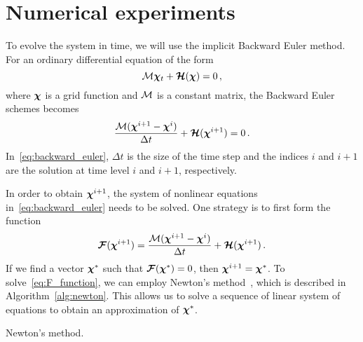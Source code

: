 \section{Numerical experiments}%
\label{sec:numerical_experiments}
To evolve the system in time, we will use the implicit Backward Euler method. For an ordinary differential equation of the form
\begin{equation*}
 \mathcal{M} \bm{\chi}_t + \bm{\mathcal{H}}(\bm{\chi}) = 0
 \, ,
\end{equation*}
where $\bm{\chi}$ is a grid function and $\mathcal{M}$ is a constant matrix, the Backward Euler schemes becomes 
\begin{equation}
  \frac{\Mn (\soln^{i+1} - \soln^i)}{\Delta t} + \Hn(\soln^{i+1}) = 0
  \,.
  \label{eq:backward_euler}
\end{equation}
In~\eqref{eq:backward_euler}, $\Delta t$ is the size of the time step and the indices $i$ and $i+1$ are the solution at time level $i$ and $i+1$, respectively.

In order to obtain $\bm{\chi}^{i+1}$, the system of nonlinear equations in~\eqref{eq:backward_euler} needs to be solved. One strategy is to first form the function 
\begin{equation}
  \Fn(\soln^{i+1}) = 
  \frac{\Mn (\soln^{i+1} - \soln^i)}{\Delta t} + \Hn(\soln^{i+1})
  \,.
  \label{eq:F_function}
\end{equation}
If we find a vector $\bm{\chi}^*$ such that $\bm{\mathcal{F}}(\bm{\chi}^*) = 0$, then $\bm{\chi}^{i+1} = \bm{\chi}^*$. To solve~\eqref{eq:F_function}, we can employ Newton's method~\cite{quarteroni2010numerical}, which is described in Algorithm~\ref{alg:newton}. This allows us to solve a sequence of linear system of equations to obtain an approximation of $\bm{\chi}^*$.
\begin{algorithm}
 \caption{Newton's method.}%
 \label{alg:newton}
\end{algorithm}

